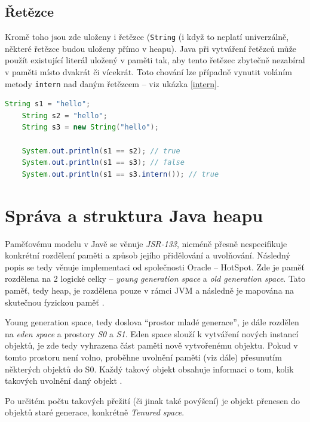 \subsection{Řetězce}
\label{java-strings}
Kromě toho jsou zde uloženy i řetězce (\texttt{String} (i když to neplatí univerzálně, některé řetězce budou uloženy přímo v heapu). Java při vytváření řetězců může použít existující literál uložený v paměti tak, aby tento řetězec zbytečně nezabíral v paměti místo dvakrát či vícekrát. Toto chování lze případně vynutit voláním metody \texttt{intern} nad daným řetězcem -- viz ukázka \ref{intern}. 

\begin{lstlisting}[caption={Příklad uchovávání řetězců a metody \texttt{intern}}, label={intern}, frame={single}, language={java}]
    String s1 = "hello";
    String s2 = "hello";
    String s3 = new String("hello");

    System.out.println(s1 == s2); // true
    System.out.println(s1 == s3); // false
    System.out.println(s1 == s3.intern()); // true
\end{lstlisting}

\section{Správa a struktura Java heapu}
\label{memory-management}

Paměťovému modelu v Javě se věnuje \textit{JSR-133}, nicméně přesně nespecifikuje konkrétní rozdělení paměti a způsob jejího přidělování a uvolňování. Následný popis se tedy věnuje implementaci od společnosti Oracle – HotSpot. Zde je paměť rozdělena na 2 logické celky – \textit{young generation space} a \textit{old generation space}. Tato paměť, tedy heap, je rozdělena pouze v rámci JVM a následně je mapována na skutečnou fyzickou paměť \cite{jsr133}.

Young generation space, tedy doslova “prostor mladé generace”, je dále rozdělen na \textit{eden space} a prostory \textit{S0} a \textit{S1}. Eden space slouží k vytváření nových instancí objektů, je zde tedy vyhrazena část paměti nově vytvořenému objektu. Pokud v tomto prostoru není volno, proběhne uvolnění paměti (viz dále) přesunutím některých objektů do S0. Každý takový objekt obsahuje informaci o tom, kolik takových uvolnění daný objekt .

Po určitém počtu takových přežití (či jinak také povýšení) je objekt přenesen do objektů staré generace, konkrétně \textit{Tenured space}.

